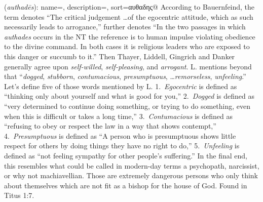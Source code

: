 \item[Machiavellian,]

(\textit{authadēs}):
{
    name=,
    description={},
    sort=αυθαδης@
}
According to Bauernfeind, the term denotes ``The critical judgement \ldots of the egocentric attitude, which as such necessarily leads to arrogance,'' further denotes ``In the two passages in which \emph{authades} occurs in the NT the reference is to human impulse violating obedience to the divine command. In both cases it is religious leaders who are exposed to this danger or succumb to it.'' Then Thayer, Liddell, Gingrich and Danker generally agree upon \emph{self-willed}, \emph{self-pleasing}, and \emph{arrogant}. L. mentions beyond that ``\emph{dogged}, \emph{stubborn}, \emph{contumacious}, \emph{presumptuous}, \ldots \emph{remorseless}, \emph{unfeeling}.'' Let's define five of those words mentioned by L.
1.~\emph{Egocentric} is defined as ``thinking only about yourself and what is good for you,''
2.~\emph{Dogged} is defined as ``very determined to continue doing something, or trying to do something, even when this is difficult or takes a long time,''
3.~\emph{Contumacious} is defined as ``refusing to obey or respect the law in a way that shows contempt,''
4.~\emph{Presumptuous} is defined as ``A person who is presumptuous shows little respect for others by doing things they have no right to do,''
5.~\emph{Unfeeling} is defined as ``not feeling sympathy for other people's suffering.''
In the final end, this resembles what could be called in modern-day terms a psychopath, narcissist, or why not machiavellian. Those are extremely dangerous persons who only think about themselves which are not fit as a bishop for the house of God.
Found in Titus 1:7.
